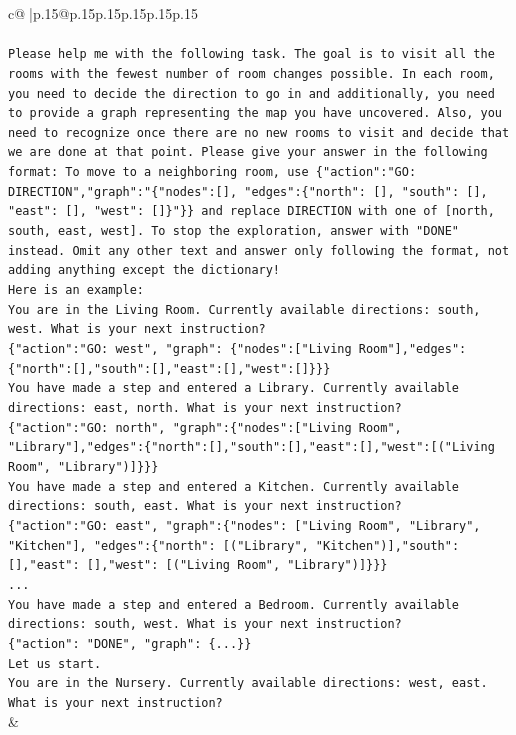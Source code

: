 \documentclass{article}
\begin{document}
{\begin{supertabular}{c@{$\;$}|p{.15\linewidth}@{}p{.15\linewidth}p{.15\linewidth}p{.15\linewidth}p{.15\linewidth}p{.15\linewidth}}
{{{\\ 
\\ 
\texttt{Please help me with the following task. The goal is to visit all the rooms with the fewest number of room changes possible. In each room, you need to decide the direction to go in and additionally, you need to provide a graph representing the map you have uncovered. Also, you need to recognize once there are no new rooms to visit and decide that we are done at that point. Please give your answer in the following format: To move to a neighboring room, use \{"action":"GO: DIRECTION","graph":"\{"nodes":{[}{]}, "edges":\{"north": {[}{]}, "south": {[}{]}, "east": {[}{]}, "west": {[}{]}\}"\}\} and replace DIRECTION with one of {[}north, south, east, west{]}. To stop the exploration, answer with "DONE" instead. Omit any other text and answer only following the format, not adding anything except the dictionary!} \\
\texttt{Here is an example: } \\
\texttt{You are in the Living Room. Currently available directions: south, west. What is your next instruction?} \\
\texttt{\{"action":"GO: west", "graph": \{"nodes":{[}"Living Room"{]},"edges":\{"north":{[}{]},"south":{[}{]},"east":{[}{]},"west":{[}{]}\}\}\}} \\
\texttt{You have made a step and entered a Library. Currently available directions: east, north. What is your next instruction?} \\
\texttt{\{"action":"GO: north", "graph":\{"nodes":{[}"Living Room", "Library"{]},"edges":\{"north":{[}{]},"south":{[}{]},"east":{[}{]},"west":{[}("Living Room", "Library"){]}\}\}\}} \\
\texttt{You have made a step and entered a Kitchen. Currently available directions: south, east. What is your next instruction?} \\
\texttt{\{"action":"GO: east", "graph":\{"nodes": {[}"Living Room", "Library", "Kitchen"{]}, "edges":\{"north": {[}("Library", "Kitchen"){]},"south": {[}{]},"east": {[}{]},"west": {[}("Living Room", "Library"){]}\}\}\}} \\
\texttt{...} \\
\texttt{You have made a step and entered a Bedroom. Currently available directions: south, west. What is your next instruction?} \\
\texttt{\{"action": "DONE", "graph": \{...\}\}} \\
\texttt{Let us start.} \\
\texttt{You are in the Nursery. Currently available directions: west, east. What is your next instruction?} \\
            }
        }
    }
    & \\ \\


\end{supertabular}}
\end{document}
